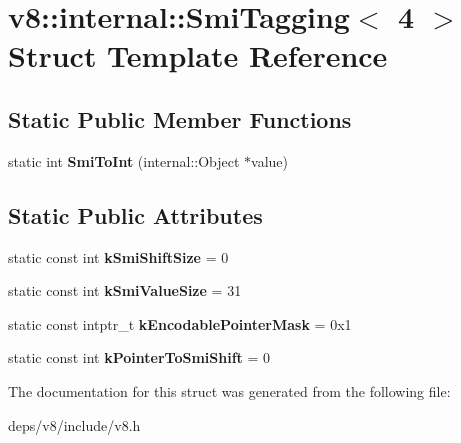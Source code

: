 \hypertarget{structv8_1_1internal_1_1_smi_tagging_3_014_01_4}{}\section{v8\+:\+:internal\+:\+:Smi\+Tagging$<$ 4 $>$ Struct Template Reference}
\label{structv8_1_1internal_1_1_smi_tagging_3_014_01_4}
\subsection*{Static Public Member Functions}
\begin{DoxyCompactItemize}
\item 
\hypertarget{structv8_1_1internal_1_1_smi_tagging_3_014_01_4_ae47c1d7f0359f4560b84fa8e573974e2}{}static int {\bfseries Smi\+To\+Int} (internal\+::\+Object $\ast$value)\label{structv8_1_1internal_1_1_smi_tagging_3_014_01_4_ae47c1d7f0359f4560b84fa8e573974e2}

\end{DoxyCompactItemize}
\subsection*{Static Public Attributes}
\begin{DoxyCompactItemize}
\item 
\hypertarget{structv8_1_1internal_1_1_smi_tagging_3_014_01_4_a4230f8d72054619f8141d0524733d8e9}{}static const int {\bfseries k\+Smi\+Shift\+Size} = 0\label{structv8_1_1internal_1_1_smi_tagging_3_014_01_4_a4230f8d72054619f8141d0524733d8e9}

\item 
\hypertarget{structv8_1_1internal_1_1_smi_tagging_3_014_01_4_a0857bbaab799b39a51f578744bf855f8}{}static const int {\bfseries k\+Smi\+Value\+Size} = 31\label{structv8_1_1internal_1_1_smi_tagging_3_014_01_4_a0857bbaab799b39a51f578744bf855f8}

\item 
\hypertarget{structv8_1_1internal_1_1_smi_tagging_3_014_01_4_a71a108200066c96b393511096387cbc3}{}static const intptr\+\_\+t {\bfseries k\+Encodable\+Pointer\+Mask} = 0x1\label{structv8_1_1internal_1_1_smi_tagging_3_014_01_4_a71a108200066c96b393511096387cbc3}

\item 
\hypertarget{structv8_1_1internal_1_1_smi_tagging_3_014_01_4_a387b431afa5d17958107860f8b2f53b9}{}static const int {\bfseries k\+Pointer\+To\+Smi\+Shift} = 0\label{structv8_1_1internal_1_1_smi_tagging_3_014_01_4_a387b431afa5d17958107860f8b2f53b9}

\end{DoxyCompactItemize}


The documentation for this struct was generated from the following file\+:\begin{DoxyCompactItemize}
\item 
deps/v8/include/v8.\+h\end{DoxyCompactItemize}
